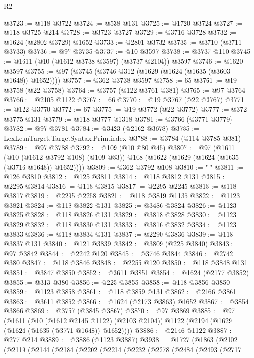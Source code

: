 \begin{lexlean}{R2}
\begin{coremodule}
@3723 := @118 @3722
@3724 := @538 @131
@3725 := @1720 @3724
@3727 := @118 @3725 @214
@3728 := @3723 @3727
@3729 := @3716 @3728
@3732 := @1624 (@2802 @3729) @1652
@3733 := @2801 @3732
@3735 := @3710 (@3711 @3733)
@3736 := @97 @3735
@3737 := @10 @3597
@3738 := @3737 @110
@3745 := @1611 (@10 (@1612 @3738 @3597) (@3737 @2104)) @3597
@3746 := @1620 @3597
@3755 := @97 (@3745 (@3746 @312 (@1629 (@1624 (@1635 (@3603 @1648)) @1652))))
@3757 := @362 @3738 @3597
@3758 := 65
@3761 := @19 @3758 (@22 @3758)
@3764 := @3757 (@122 @3761 @381)
@3765 := @97 @3764
@3766 := @2105 @1122
@3767 := 66
@3770 := @19 @3767 (@22 @3767)
@3771 := @122 @3770
@3772 := 67
@3775 := @19 @3772 (@22 @3772)
@3777 := @372 @3775 @131
@3779 := @118 @3777 @1318
@3781 := @3766 (@3771 @3779)
@3782 := @97 @3781
@3784 := @3423 (@2162 @3678)
@3785 := LexLeanTarget.TargetSyntax.Prim.index
@3788 := @3784 (@114 @3785 @381)
@3789 := @97 @3788
@3792 := @109 (@10 @80 @45)
@3807 := @97
    (@1611
      (@10 (@1612 @3792 @108) (@109 @83))
      @108
      (@1622 (@1629 (@1624 (@1635 (@3716 @1648)) @1652))))
@3809 := @362 @3792 @108
@3810 := "          "
@3811 := @126 @3810
@3812 := @125 @3811
@3814 := @118 @3812 @131
@3815 := @2295 @3814
@3816 := @118 @3815
@3817 := @2295 @2245
@3818 := @118 @3817
@3819 := @2295 @2258
@3821 := @118 @3819 @1136
@3822 := @1123 @3821
@3824 := @118 @3822 @131
@3825 := @3486 @3824
@3826 := @1123 @3825
@3828 := @118 @3826 @131
@3829 := @3818 @3828
@3830 := @1123 @3829
@3832 := @118 @3830 @131
@3833 := @3816 @3832
@3834 := @1123 @3833
@3836 := @118 @3834 @131
@3837 := @2290 @3836
@3839 := @118 @3837 @131
@3840 := @121 @3839
@3842 := @3809 (@225 @3840)
@3843 := @97 @3842
@3844 := @2242 @120
@3845 := @3746 @3844
@3846 := @2742 @380
@3847 := @118 @3846
@3848 := @2255 @120
@3850 := @118 @3848 @131
@3851 := @3847 @3850
@3852 := @3611 @3851
@3854 := @1624 (@2177 @3852)
@3855 := @313 @380
@3856 := @225 @3855
@3858 := @118 @3856 @3850
@3859 := @1123 @3858
@3861 := @118 @3859 @131
@3862 := @2166 @3861
@3863 := @3611 @3862
@3866 := @1624 (@2173 @3863) @1652
@3867 := @3854 @3866
@3869 := @3757 (@3845 @3867)
@3870 := @97 @3869
@3885 := @97
    (@1611
      (@10 (@1612 @2145 @1122) (@2103 @2104))
      @1122
      (@2194 (@1629 (@1624 (@1635 (@3771 @1648)) @1652))))
@3886 := @2146 @1122
@3887 := @277 @214
@3889 := @3886 (@1123 @3887)
@3938 := @1727
    (@1863
      (@2102
        (@2119
          (@2144
            (@2184
              (@2202
                (@2214
                  (@2232
                    (@2278
                      (@2484
                        (@2493
                          (@2717

\end{coremodule}
\end{lexlean}
